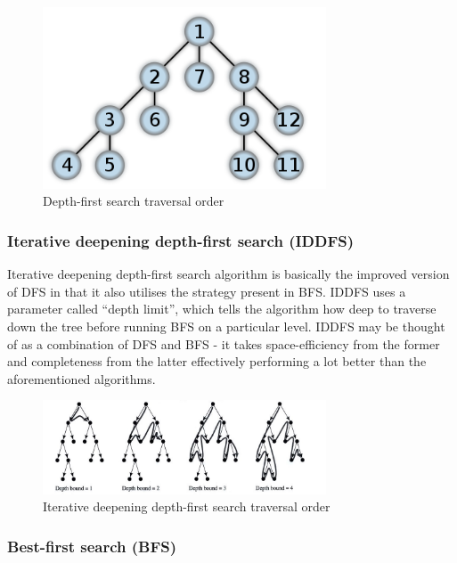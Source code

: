 \documentclass[12pt]{article}
\begin{document}
\begin{figure}[h]
    \includegraphics[width=0.75\textwidth]{dfs}
    \centering
    \caption{Depth-first search traversal order \cite{dfs_image}}
\end{figure}

\subsubsection{Iterative deepening depth-first search (IDDFS)}

Iterative deepening depth-first search algorithm is basically the improved version of DFS in that it also utilises the strategy present in BFS. IDDFS uses a parameter called ``depth limit'', which tells the algorithm how deep to traverse down the tree before running BFS on a particular level. IDDFS may be thought of as a combination of DFS and BFS - it takes space-efficiency from the former and completeness from the latter effectively performing a lot better than the aforementioned algorithms.

\begin{figure}[h]
    \includegraphics[width=0.75\textwidth]{iddfs}
    \centering
    \caption{Iterative deepening depth-first search traversal order \cite{iddfs_image}}
\end{figure}

\subsubsection{Best-first search (BFS)}
\end{document}
